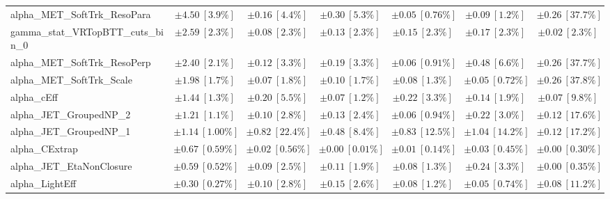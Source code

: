 \begin{sidewaystable}
\begin{center}
\begin{tabular*}{\textwidth}{@{\extracolsep{\fill}}lcccccc}
alpha\_MET\_SoftTrk\_ResoPara         & $\pm 4.50\ [3.9\%] $          & $\pm 0.16\ [4.4\%] $          & $\pm 0.30\ [5.3\%] $          & $\pm 0.05\ [0.76\%] $          & $\pm 0.09\ [1.2\%] $          & $\pm 0.26\ [37.7\%] $       \\
gamma\_stat\_VRTopBTT\_cuts\_bin\_0         & $\pm 2.59\ [2.3\%] $          & $\pm 0.08\ [2.3\%] $          & $\pm 0.13\ [2.3\%] $          & $\pm 0.15\ [2.3\%] $          & $\pm 0.17\ [2.3\%] $          & $\pm 0.02\ [2.3\%] $       \\
alpha\_MET\_SoftTrk\_ResoPerp         & $\pm 2.40\ [2.1\%] $          & $\pm 0.12\ [3.3\%] $          & $\pm 0.19\ [3.3\%] $          & $\pm 0.06\ [0.91\%] $          & $\pm 0.48\ [6.6\%] $          & $\pm 0.26\ [37.7\%] $       \\
alpha\_MET\_SoftTrk\_Scale         & $\pm 1.98\ [1.7\%] $          & $\pm 0.07\ [1.8\%] $          & $\pm 0.10\ [1.7\%] $          & $\pm 0.08\ [1.3\%] $          & $\pm 0.05\ [0.72\%] $          & $\pm 0.26\ [37.8\%] $       \\
alpha\_cEff         & $\pm 1.44\ [1.3\%] $          & $\pm 0.20\ [5.5\%] $          & $\pm 0.07\ [1.2\%] $          & $\pm 0.22\ [3.3\%] $          & $\pm 0.14\ [1.9\%] $          & $\pm 0.07\ [9.8\%] $       \\
alpha\_JET\_GroupedNP\_2         & $\pm 1.21\ [1.1\%] $          & $\pm 0.10\ [2.8\%] $          & $\pm 0.13\ [2.4\%] $          & $\pm 0.06\ [0.94\%] $          & $\pm 0.22\ [3.0\%] $          & $\pm 0.12\ [17.6\%] $       \\
alpha\_JET\_GroupedNP\_1         & $\pm 1.14\ [1.00\%] $          & $\pm 0.82\ [22.4\%] $          & $\pm 0.48\ [8.4\%] $          & $\pm 0.83\ [12.5\%] $          & $\pm 1.04\ [14.2\%] $          & $\pm 0.12\ [17.2\%] $       \\
alpha\_CExtrap         & $\pm 0.67\ [0.59\%] $          & $\pm 0.02\ [0.56\%] $          & $\pm 0.00\ [0.01\%] $          & $\pm 0.01\ [0.14\%] $          & $\pm 0.03\ [0.45\%] $          & $\pm 0.00\ [0.30\%] $       \\
alpha\_JET\_EtaNonClosure         & $\pm 0.59\ [0.52\%] $          & $\pm 0.09\ [2.5\%] $          & $\pm 0.11\ [1.9\%] $          & $\pm 0.08\ [1.3\%] $          & $\pm 0.24\ [3.3\%] $          & $\pm 0.00\ [0.35\%] $       \\
alpha\_LightEff         & $\pm 0.30\ [0.27\%] $          & $\pm 0.10\ [2.8\%] $          & $\pm 0.15\ [2.6\%] $          & $\pm 0.08\ [1.2\%] $          & $\pm 0.05\ [0.74\%] $          & $\pm 0.08\ [11.2\%] $       \\

\end{tabular*}
\end{center}
\end{sidewaystable}
